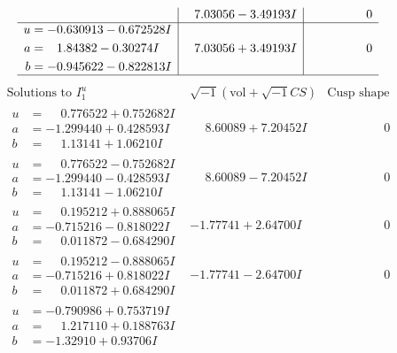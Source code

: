\documentclass[1p]{elsarticle_modified}
\theoremstyle{definition}
\newcommand{\I}{\sqrt{-1}}
\begin{document}
$$\begin{array}{c|c|c}
 & \phantom{-}7.03056 - 3.49193 I & \phantom{-0.000000 } 0 \\ \hline\begin{aligned}
u &= -0.630913 - 0.672528 I \\
a &= \phantom{-}1.84382 - 0.30274 I \\
b &= -0.945622 - 0.822813 I\end{aligned}
 & \phantom{-}7.03056 + 3.49193 I & \phantom{-0.000000 } 0\\
 \hline 
 \end{array}$$\newpage$$\begin{array}{c|c|c}  
\text{Solutions to }I^u_{1}& \I (\text{vol} + \sqrt{-1}CS) & \text{Cusp shape}\\
 \hline 
\begin{aligned}
u &= \phantom{-}0.776522 + 0.752682 I \\
a &= -1.299440 + 0.428593 I \\
b &= \phantom{-}1.13141 + 1.06210 I\end{aligned}
 & \phantom{-}8.60089 + 7.20452 I & \phantom{-0.000000 } 0 \\ \hline\begin{aligned}
u &= \phantom{-}0.776522 - 0.752682 I \\
a &= -1.299440 - 0.428593 I \\
b &= \phantom{-}1.13141 - 1.06210 I\end{aligned}
 & \phantom{-}8.60089 - 7.20452 I & \phantom{-0.000000 } 0 \\ \hline\begin{aligned}
u &= \phantom{-}0.195212 + 0.888065 I \\
a &= -0.715216 - 0.818022 I \\
b &= \phantom{-}0.011872 - 0.684290 I\end{aligned}
 & -1.77741 + 2.64700 I & \phantom{-0.000000 } 0 \\ \hline\begin{aligned}
u &= \phantom{-}0.195212 - 0.888065 I \\
a &= -0.715216 + 0.818022 I \\
b &= \phantom{-}0.011872 + 0.684290 I\end{aligned}
 & -1.77741 - 2.64700 I & \phantom{-0.000000 } 0 \\ \hline\begin{aligned}
u &= -0.790986 + 0.753719 I \\
a &= \phantom{-}1.217110 + 0.188763 I \\
b &= -1.32910 + 0.93706 I\end{aligned}

\end{array}$$
\end{document}

